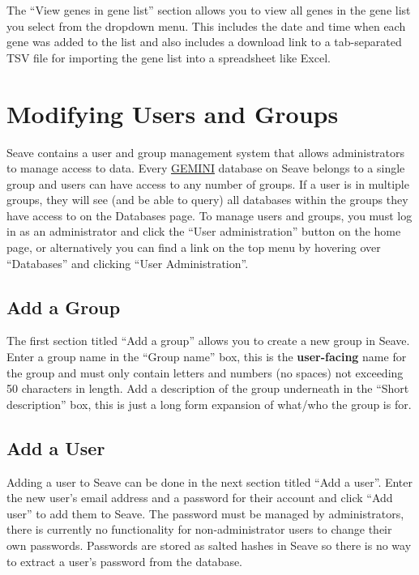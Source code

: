 \documentclass[11pt, a4paper]{article}
\newcommand{\GEMINI}{\href{https://gemini.readthedocs.io}{GEMINI} } %
\begin{document}
The ``View genes in gene list'' section allows you to view all genes in the gene list you select from the dropdown menu. This includes the date and time when each gene was added to the list and also includes a download link to a tab-separated TSV file for importing the gene list into a spreadsheet like Excel.


\section{Modifying Users and Groups}

Seave contains a user and group management system that allows administrators to manage access to data. Every \GEMINI database on Seave belongs to a single group and users can have access to any number of groups. If a user is in multiple groups, they will see (and be able to query) all databases within the groups they have access to on the Databases page. To manage users and groups, you must log in as an administrator and click the ``User administration'' button on the home page, or alternatively you can find a link on the top menu by hovering over ``Databases'' and clicking ``User Administration''.


\subsection{Add a Group}

The first section titled ``Add a group'' allows you to create a new group in Seave. Enter a group name in the ``Group name'' box, this is the \textbf{user-facing} name for the group and must only contain letters and numbers (no spaces) not exceeding 50 characters in length. Add a description of the group underneath in the ``Short description'' box, this is just a long form expansion of what/who the group is for.


\subsection{Add a User}

Adding a user to Seave can be done in the next section titled ``Add a user''. Enter the new user's email address and a password for their account and click ``Add user'' to add them to Seave. The password must be managed by administrators, there is currently no functionality for non-administrator users to change their own passwords. Passwords are stored as salted hashes in Seave so there is no way to extract a user's password from the database.
\end{document}
